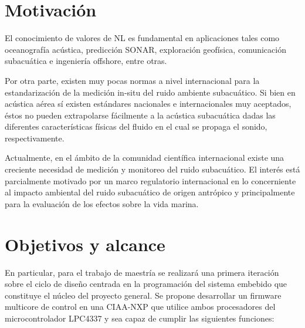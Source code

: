 


\section{Motivación}


El conocimiento de valores de NL es fundamental en aplicaciones tales como oceanografía acústica, predicción SONAR, exploración geofísica, comunicación subacuática e ingeniería offshore, entre otras.

Por otra parte, existen muy pocas normas a nivel internacional para la estandarización de la medición in-situ del ruido ambiente subacuático. Si bien en acústica aérea sí existen estándares nacionales e internacionales muy aceptados, éstos no pueden extrapolarse fácilmente a la acústica subacuática dadas las diferentes características físicas del fluido en el cual se propaga el sonido, respectivamente.

Actualmente, en el ámbito de la comunidad científica internacional existe una creciente necesidad de medición y monitoreo del ruido subacuático. El interés está parcialmente motivado por un marco regulatorio internacional en lo concerniente al impacto ambiental del ruido subacuático de origen antrópico y principalmente para la evaluación de los efectos sobre la vida marina.



\section{Objetivos y alcance}


En particular, para el trabajo de maestría se realizará una primera iteración sobre el ciclo de diseño centrada en la programación del sistema embebido que constituye el núcleo del proyecto general.  Se propone desarrollar un firmware multicore de control en una CIAA-NXP que utilice ambos procesadores del microcontrolador LPC4337 y sea capaz de cumplir las siguientes funciones:

